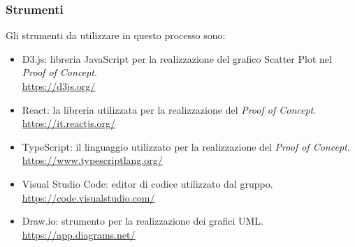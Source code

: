 \setlength\extrarowheight{0pt}

\subsubsection{Strumenti}
Gli strumenti da utilizzare in questo processo sono:
\begin{itemize}
    \item D3.js: libreria JavaScript per la realizzazione del grafico Scatter Plot nel \textit{Proof of Concept}.\\
    \href{https://d3js.org/}{https://d3js.org/}
    \item React: la libreria utilizzata per la realizzazione del \textit{Proof of Concept}.\\
    \href{https://it.reactjs.org/}{https://it.reactjs.org/}
    \item TypeScript: il linguaggio utilizzato per la realizzazione del \textit{Proof of Concept}.\\
    \href{https://www.typescriptlang.org/}{https://www.typescriptlang.org/}
    \item Visual Studio Code: editor di codice utilizzato dal gruppo. \\
    \href{https://code.visualstudio.com/}{https://code.visualstudio.com/}
    \item Draw.io: strumento per la realizzazione dei grafici UML.\\
    \href{https://app.diagrams.net/}{https://app.diagrams.net/}
\end{itemize}
